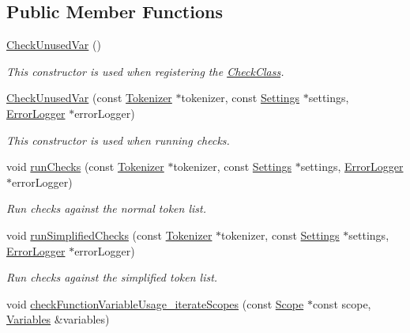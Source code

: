 \subsection*{Public Member Functions}
\begin{DoxyCompactItemize}
\item 
\hyperlink{class_check_unused_var_a827bebd0450ed79ccead1d6af6754c23}{Check\-Unused\-Var} ()
\begin{DoxyCompactList}\small\item\em This constructor is used when registering the \hyperlink{class_check_class}{Check\-Class}. \end{DoxyCompactList}\item 
\hyperlink{class_check_unused_var_abab31c1d18d2cd28e5b37697e8e26d36}{Check\-Unused\-Var} (const \hyperlink{class_tokenizer}{Tokenizer} $\ast$tokenizer, const \hyperlink{class_settings}{Settings} $\ast$settings, \hyperlink{class_error_logger}{Error\-Logger} $\ast$error\-Logger)
\begin{DoxyCompactList}\small\item\em This constructor is used when running checks. \end{DoxyCompactList}\item 
void \hyperlink{class_check_unused_var_ae2a9e52d785e4303f9e6daa9c3e3cb58}{run\-Checks} (const \hyperlink{class_tokenizer}{Tokenizer} $\ast$tokenizer, const \hyperlink{class_settings}{Settings} $\ast$settings, \hyperlink{class_error_logger}{Error\-Logger} $\ast$error\-Logger)
\begin{DoxyCompactList}\small\item\em Run checks against the normal token list. \end{DoxyCompactList}\item 
void \hyperlink{class_check_unused_var_a69fd727c2bb04622a48024ad6c7b2a0e}{run\-Simplified\-Checks} (const \hyperlink{class_tokenizer}{Tokenizer} $\ast$tokenizer, const \hyperlink{class_settings}{Settings} $\ast$settings, \hyperlink{class_error_logger}{Error\-Logger} $\ast$error\-Logger)
\begin{DoxyCompactList}\small\item\em Run checks against the simplified token list. \end{DoxyCompactList}\item 
void \hyperlink{class_check_unused_var_aae8ccc57e79be407ab5b154f2dba862a}{check\-Function\-Variable\-Usage\-\_\-iterate\-Scopes} (const \hyperlink{class_scope}{Scope} $\ast$const scope, \hyperlink{class_variables}{Variables} \&variables)

\end{DoxyCompactItemize}
